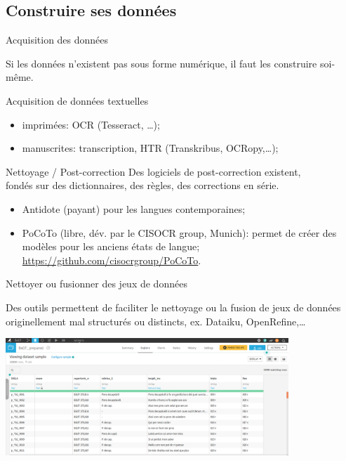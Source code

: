 \documentclass[ignorenonframetext]{beamer}
\begin{document}
\subsection{Construire ses données}



\begin{frame}{Acquisition des données}

Si les données n'existent pas sous forme numérique, il faut les construire soi-même.
	
	
	
		\begin{block}{Acquisition de données textuelles}
			\begin{itemize}
				\item imprimées: OCR (Tesseract, …);
				\item manuscrites: transcription, HTR (Transkribus, OCRopy,…);
			\end{itemize}
		\end{block}
	
	\begin{block}{Nettoyage / Post-correction}
		Des logiciels de post-correction existent,\\
		fondés sur des dictionnaires, des règles, des corrections en série.
		\begin{itemize}
			\item Antidote (payant) pour les langues contemporaines;
			\item PoCoTo (libre, dév. par le CISOCR group, Munich): permet de 
			créer des modèles pour les anciens états de langue; \url{https://github.com/cisocrgroup/PoCoTo}.
		\end{itemize}
	\end{block}
	
\end{frame}

\begin{frame}{Nettoyer ou fusionner des jeux de données}


Des outils permettent de faciliter le nettoyage ou la fusion de jeux de données originellement mal structurés ou distincts, ex. Dataiku, OpenRefine,…

\begin{center}
	\includegraphics[width=0.8\textwidth]{img/Dataiku.png}
\end{center}

\end{frame}
\end{document}
